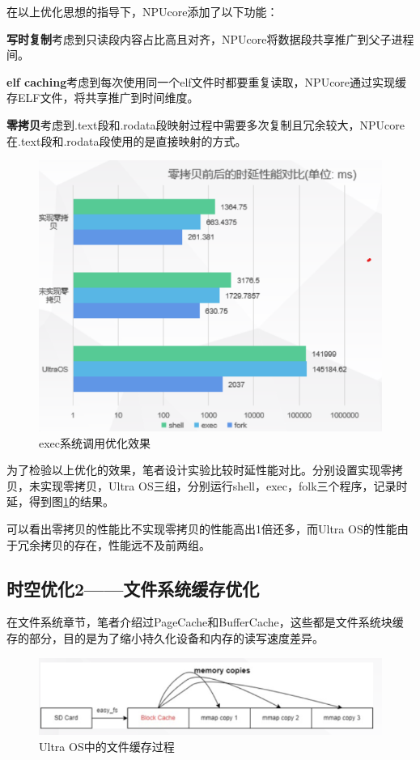 在以上优化思想的指导下，NPUcore添加了以下功能：

\textbf{写时复制}\;考虑到只读段内容占比高且对齐，NPUcore将数据段共享推广到父子进程间。

\textbf{elf caching}\;考虑到每次使用同一个elf文件时都要重复读取，NPUcore通过实现缓存ELF文件，将共享推广到时间维度。

\textbf{零拷贝}\;考虑到.text段和.rodata段映射过程中需要多次复制且冗余较大，NPUcore在.text段和.rodata段使用的是直接映射的方式。

\begin{figure}[htbp]
	\centering
	\includegraphics[scale=0.75]{figures/10-04/10-04-exec系统调用优化效果.png}
	\caption{exec系统调用优化效果}
	\label{exam-4}
\end{figure}

为了检验以上优化的效果，笔者设计实验比较时延性能对比。分别设置实现零拷贝，未实现零拷贝，Ultra OS三组，分别运行shell，exec，folk三个程序，记录时延，得到图\ref{exam-4}的结果。

可以看出零拷贝的性能比不实现零拷贝的性能高出1倍还多，而Ultra OS的性能由于冗余拷贝的存在，性能远不及前两组。

\subsection{时空优化2——文件系统缓存优化}

在文件系统章节，笔者介绍过PageCache和BufferCache，这些都是文件系统块缓存的部分，目的是为了缩小持久化设备和内存的读写速度差异。

\begin{figure}[htbp]
	\centering
	\includegraphics[scale=0.75]{figures/10-04/10-04-Ultra OS中的文件缓存过程.png}
	\caption{Ultra OS中的文件缓存过程}
	\label{exam-5}
\end{figure}

